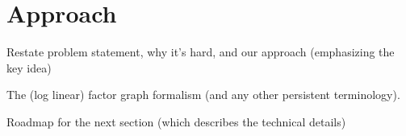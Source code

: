 \section{Approach}
\label{sec:approach}

Restate problem statement, why it's hard, and our approach (emphasizing the key idea)

The (log linear) factor graph formalism (and any other persistent terminology).

Roadmap for the next section (which describes the technical details)
